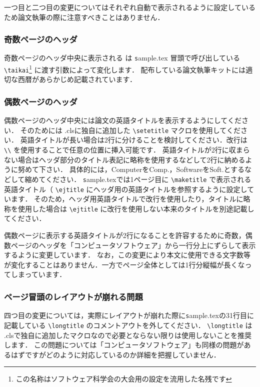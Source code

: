 \documentclass[T,J]{fose} %
\newcommand{\foseclassfile}{\MakeLowercase{\foseabbrev}.cls}
\begin{document}
一つ目と二つ目の変更についてはそれぞれ自動で表示されるように設定しているため論文執筆の際に注意すべきことはありません．

\subsubsection{奇数ページのヘッダ}
奇数ページのヘッダ中央に表示される {\textbf \foseabbrev } は {\texttt sample.tex } 冒頭で呼び出している \verb|\taikai|\footnote{この名称はソフトウェア科学会の大会用の設定を流用した名残です} に渡す引数によって変化します．
配布している論文執筆キットには適切な西暦があらかじめ記載されています．

\subsubsection{偶数ページのヘッダ}
偶数ページのヘッダ中央には論文の英語タイトルを表示するようにしてください．
そのためには \foseclassfile に独自に追加した \verb|\setetitle| マクロを使用してください．
英語タイトルが長い場合は2行に分けることを検討してください．改行は \verb|\\| を使用することで任意の位置に挿入可能です．
英語タイトルが2行に収まらない場合はヘッダ部分のタイトル表記に略称を使用するなどして2行に納めるように努めて下さい．
具体的には，ComputerをComp.，SoftwareをSoft.とするなどして縮めてください．
{\texttt sample.tex}では1ページ目に \verb|\maketitle| で表示される英語タイトル（ \verb|\ejtitle| にヘッダ用の英語タイトルを参照するように設定しています．
そのため，ヘッダ用英語タイトルで改行を使用したり，タイトルに略称を使用した場合は \verb|\ejtitle| に改行を使用しない本来のタイトルを別途記載してください．

偶数ページに表示する英語タイトルが2行になることを許容するために奇数，偶数ページのヘッダを「コンピュータソフトウェア」から一行分上にずらして表示するように変更しています．
なお，この変更により本文に使用できる文字数等が変化することはありません．一方でページ全体としては1行分縦幅が長くなってしまっています．

\subsubsection{ページ冒頭のレイアウトが崩れる問題}
四つ目の変更については，実際にレイアウトが崩れた際に{\texttt sample.tex}の31行目に記載している \verb|\longtitle| のコメントアウトを外してください．
\verb|\longtitle| は \foseclassfile で独自に追加したマクロなので必要とならない限りは使用しないことを推奨します．
この問題については「コンピュータソフトウェア」も同様の問題があるはずですがどのように対応しているのか詳細を把握していません．
\end{document}
